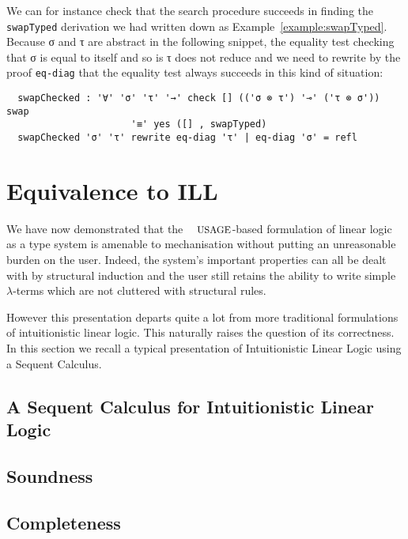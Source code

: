 \documentclass[a4paper,UKenglish]{lipics-v2016}
\begin{document}
\begin{example}We can for instance check that the search procedure
succeeds in finding the \texttt{swapTyped} derivation we had written down
as Example~\ref{example:swapTyped}. Because σ and τ are abstract in the
following snippet, the equality test checking that σ is equal to itself
and so is τ does not reduce and we need to rewrite by the proof
\texttt{eq-diag} that the equality test always succeeds in this kind of
situation:
\begin{lstlisting}
  swapChecked : '∀' 'σ' 'τ' '→' check [] (('σ ⊗ τ') '⊸' ('τ ⊗ σ')) swap
                      '≡' yes ([] , swapTyped)
  swapChecked 'σ' 'τ' rewrite eq-diag 'τ' | eq-diag 'σ' = refl
\end{lstlisting}
\end{example}



\section{Equivalence to ILL}\label{sec:equivalence}

We have now demonstrated that the $\Usages{}$-based formulation of
linear logic as a type system is amenable to mechanisation without
putting an unreasonable burden on the user. Indeed, the system's
important properties can all be dealt with by structural induction
and the user still retains the ability to write simple $λ$-terms
which are not cluttered with structural rules.

However this presentation departs quite a lot from more traditional
formulations of intuitionistic linear logic. This naturally raises
the question of its correctness. In this section we recall a typical
presentation of Intuitionistic Linear Logic using a Sequent Calculus.

\subsection{A Sequent Calculus for Intuitionistic Linear Logic}

\subsection{Soundness}


\subsection{Completeness}
\end{document}
